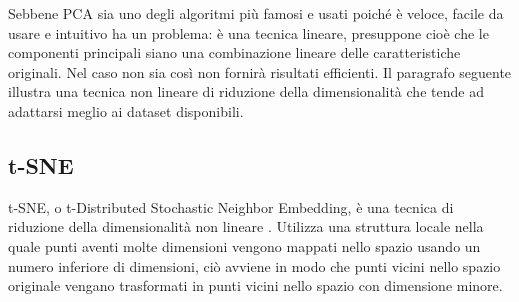 \documentclass[12pt,italian]{report}
\begin{document}
Sebbene PCA sia uno degli algoritmi più famosi e usati poiché è veloce, facile da usare e intuitivo ha un problema: è una tecnica lineare, presuppone cioè che le componenti principali siano una combinazione lineare delle caratteristiche originali. Nel caso non sia così non fornirà risultati efficienti. 
Il paragrafo seguente illustra una tecnica non lineare di riduzione della dimensionalità che tende ad adattarsi meglio ai dataset disponibili.
\subsection{t-SNE}
t-SNE, o t-Distributed Stochastic Neighbor Embedding, è una tecnica di riduzione della dimensionalità non lineare \cite{t-SNE}. Utilizza una struttura locale nella quale punti aventi molte dimensioni vengono mappati nello spazio usando un numero inferiore di dimensioni, ciò avviene in modo che punti vicini nello spazio originale vengano trasformati in punti vicini nello spazio con dimensione minore.
 
\end{document}
